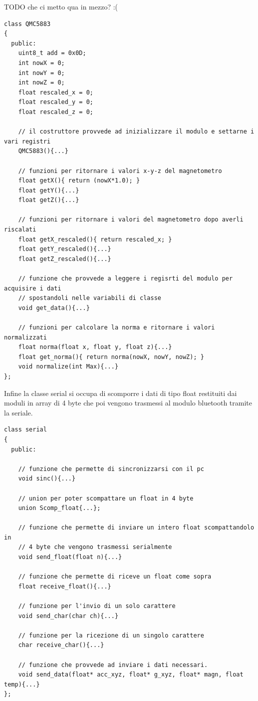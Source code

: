 \documentclass[10pt,a4paper]{article}
\begin{document}
TODO che ci metto qua in mezzo? :(
\begin{lstlisting}[style=myArduino, caption=classe "QMC5883", captionpos=b]
class QMC5883
{
  public:
    uint8_t add = 0x0D;
    int nowX = 0;
    int nowY = 0;
    int nowZ = 0;
    float rescaled_x = 0; 
    float rescaled_y = 0;
    float rescaled_z = 0;
    
    // il costruttore provvede ad inizializzare il modulo e settarne i vari registri 
    QMC5883(){...}
    
    // funzioni per ritornare i valori x-y-z del magnetometro
    float getX(){ return (nowX*1.0); }
    float getY(){...}
    float getZ(){...}

    // funzioni per ritornare i valori del magnetometro dopo averli riscalati
    float getX_rescaled(){ return rescaled_x; }
    float getY_rescaled(){...}
    float getZ_rescaled(){...}
  
    // funzione che provvede a leggere i regisrti del modulo per acquisire i dati
    // spostandoli nelle variabili di classe
    void get_data(){...}

    // funzioni per calcolare la norma e ritornare i valori normalizzati 
    float norma(float x, float y, float z){...}
    float get_norma(){ return norma(nowX, nowY, nowZ); }
    void normalize(int Max){...}
};
\end{lstlisting}
%
%
Infine la classe serial si occupa di scomporre i dati di tipo float restituiti dai moduli in array di 4 byte che poi vengono trasmessi al modulo bluetooth tramite la seriale.
\begin{lstlisting}[style=myArduino, caption=classe "serial", captionpos=b]
class serial
{
  public:

    // funzione che permette di sincronizzarsi con il pc
    void sinc(){...}

    // union per poter scompattare un float in 4 byte
    union Scomp_float{...};

    // funzione che permette di inviare un intero float scompattandolo in 
    // 4 byte che vengono trasmessi serialmente
    void send_float(float n){...}

    // funzione che permette di riceve un float come sopra
    float receive_float(){...}

    // funzione per l'invio di un solo carattere
    void send_char(char ch){...}

    // funzione per la ricezione di un singolo carattere
    char receive_char(){...}

    // funzione che provvede ad inviare i dati necessari.
    void send_data(float* acc_xyz, float* g_xyz, float* magn, float temp){...} 
};
\end{lstlisting}
\end{document}
